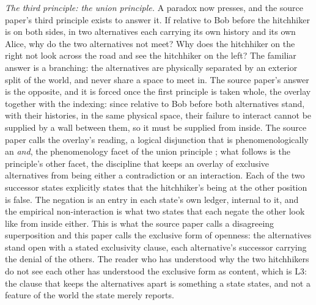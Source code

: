 \textit{The third principle: the union principle.} A paradox now presses, and the source paper's third principle exists to answer it. If relative to Bob before the hitchhiker is on both sides, in two alternatives each carrying its own history and its own Alice, why do the two alternatives not meet? Why does the hitchhiker on the right not look across the road and see the hitchhiker on the left? The familiar answer is a branching: the alternatives are physically separated by an exterior split of the world, and never share a space to meet in. The source paper's answer is the opposite, and it is forced once the first principle is taken whole, the overlay together with the indexing: since relative to Bob before both alternatives stand, with their histories, in the same physical space, their failure to interact cannot be supplied by a wall between them, so it must be supplied from inside. The source paper calls the overlay's reading, a logical disjunction that is phenomenologically an \emph{and}, the phenomenology facet of the union principle \cite{Aethus}; what follows is the principle's other facet, the discipline that keeps an overlay of exclusive alternatives from being either a contradiction or an interaction. Each of the two successor states explicitly states that the hitchhiker's being at the other position is false. The negation is an entry in each state's own ledger, internal to it, and the empirical non-interaction is what two states that each negate the other look like from inside either. This is what the source paper calls a disagreeing superposition and this paper calls the exclusive form of openness: the alternatives stand open with a stated exclusivity clause, each alternative's successor carrying the denial of the others. The reader who has understood why the two hitchhikers do not see each other has understood the exclusive form as content, which is L3: the clause that keeps the alternatives apart is something a state states, and not a feature of the world the state merely reports.
